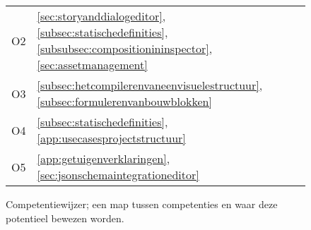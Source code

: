 \begin{appendices}
\begin{figure}[htb]
\begin{tabular}{ | l | l | }
            O2 & \autoref{sec:storyanddialogeditor}, \autoref{subsec:statischedefinities}, \autoref{subsubsec:compositionininspector}, \autoref{sec:assetmanagement} \\
            O3 & \autoref{subsec:hetcompilerenvaneenvisuelestructuur}, \autoref{subsec:formulerenvanbouwblokken} \\
            O4 & \autoref{subsec:statischedefinities}, \autoref{app:usecasesprojectstructuur} \\
            O5 & \autoref{app:getuigenverklaringen}, \autoref{sec:jsonschemaintegrationeditor} \\
            \hline
        \end{tabular}
        \centering
        \caption{Competentiewijzer; een map tussen competenties en waar deze potentieel bewezen worden.}
    \end{figure}

    
    
\end{appendices}